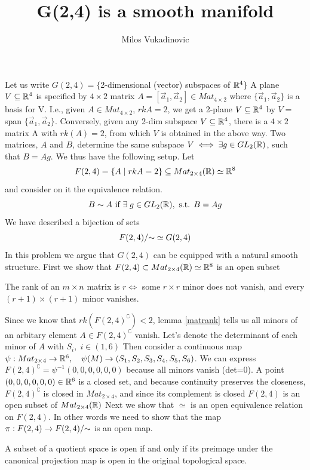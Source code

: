 \documentclass[11pt,a4paper]{report}
\author{Milos Vukadinovic}
\title{G(2,4) is a smooth manifold}
\begin{document}
Let us write $G(2,4) = \{ $2-dimensional (vector) subspaces of $\mathbb{R}^4 \}$ A plane $V \subseteq \mathbb{R}^4$ is specified by $4\times2$ matrix $A=[\vec{a}_1,\vec{a}_2] \in Mat_{4\times 2}$ where 
$\{\vec{a}_1, \vec{a}_2\}$ is a basis for V. I.e., given $A \in Mat_{4\times 2}$, $rk A = 2$, we get a 2-plane $V \subseteq \mathbb{R}^4$ by $V=$span $\{\vec{a}_1,\vec{a}_2\} $. Conversely, given any 2-dim subspace $V\subseteq \mathbb{R}^4$, there is a $4\times 2$
 matrix A with $rk(A)=2$, from which $V$ is obtained in the above way. Two matrices, $A$ and $B$, determine the same subspace $V \iff \exists g \in GL_2(\mathbb{R}) $, such that $B = A g$. 
\newline
We thus have the following setup. Let
$$ F(2,4) = \{ A \; | \;  rkA=2 \} \subseteq Mat_{2\times4}(\mathbb{R})  \simeq \mathbb{R}^8 $$
and consider on it the equivalence relation.
$$ B \sim A \text{ if } \exists \; g \in GL_2(\mathbb{R}), \text{ s.t. } B=Ag $$
We have described a bijection of sets
$$ F(2,4)/{\sim} \simeq  G(2,4) $$ 
In this problem we argue that $G(2,4)$ can be equipped with a natural smooth structure. 
\newline
\newline
First we show that $F(2,4) \subset Mat_{2 \times 4} (\mathbb{R}) \simeq \mathbb{R}^8$ is an open subset
\begin{Lemma}\label{matrank}
    The rank of an $m \times n$ matrix is $r \iff$ some $r \times r$ minor does not vanish,
    and every $(r+1) \times (r+1)$ minor vanishes.
\end{Lemma}
Since we know that $rk(F(2,4)^\complement )<2$, lemma \ref{matrank} tells us all minors
of an arbitary element $ A \in F(2,4)^\complement$ vanish. Let's denote the determinant of each minor of $A$ with $S_i, \; i\in (1,6)$ 
Then consider a continuous map
$ \psi: Mat_{2\times4} \to \mathbb{R}^6, \quad \psi(M) \to (S_1,S_2,S_3,S_4,S_5,S_6)$.
We can express $F(2,4)^\complement = \psi ^{-1} (0,0,0,0,0,0)$ because all minors vanish (det=0).
A point $(0,0,0,0,0,0) \in \mathbb{R}^6$ is a closed set, and because continuity preserves the closeness, $F(2,4)^\complement$ is closed in $Mat_{2 \times 4}$,
and since its complement is closed $F(2,4)$ is an open subset of $Mat_{2 \times 4}(\mathbb{R})$
\newline
\newline
Next we show that $\simeq$ is an open equivalence relation on $F(2,4)$.
In other words we need to show that the map $\pi: F(2,4) \to F(2,4)/{\sim}$ is an open map.
\newline
\begin{Lemma} \label{quotientTop}
    A subset of a quotient space is open if and only if its
    preimage under the canonical projection map is open in the original topological space.
\end{Lemma}
\end{document}
